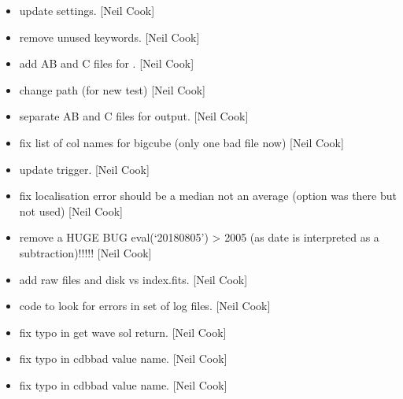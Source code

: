 \documentclass[a4paper,10pt,english]{report}
\begin{document}
\begin{itemize}
\item {} 
 \sphinxhyphen{} update settings. {[}Neil Cook{]}

\item {} 
 \sphinxhyphen{} remove unused keywords. {[}Neil Cook{]}

\item {} 
 \sphinxhyphen{} add AB and C files for . {[}Neil Cook{]}

\item {} 
 \sphinxhyphen{} change path (for new test) {[}Neil Cook{]}

\item {} 
 \sphinxhyphen{} separate AB and C files for output. {[}Neil
Cook{]}

\item {} 
 \sphinxhyphen{} fix list of col names for bigcube (only one bad
file now) {[}Neil Cook{]}

\item {} 
 \sphinxhyphen{} update trigger. {[}Neil Cook{]}

\item {} 
 \sphinxhyphen{} fix localisation error \sphinxhyphen{} should be a median not an
average (option was there but not used) {[}Neil Cook{]}

\item {} 
 \sphinxhyphen{} remove a HUGE BUG \sphinxhyphen{} eval(‘2018\sphinxhyphen{}08\sphinxhyphen{}05’) \textendash{}\textgreater{} 2005 (as
date is interpreted as a subtraction)!!!!! {[}Neil Cook{]}

\item {} 
 \sphinxhyphen{} add raw files and disk vs index.fits.
{[}Neil Cook{]}

\item {} 
 \sphinxhyphen{} code to look for errors in set of log files. {[}Neil
Cook{]}

\item {} 
 \sphinxhyphen{} fix typo in get wave sol return. {[}Neil
Cook{]}

\item {} 
 \sphinxhyphen{} fix typo in cdbbad value name. {[}Neil Cook{]}

\item {} 
 \sphinxhyphen{} fix typo in cdbbad value name. {[}Neil Cook{]}

\end{itemize}
\end{document}

